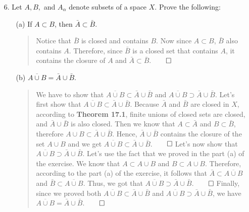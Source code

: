 \documentclass[12pt, a4paper]{article}
\begin{document}
\begin{itemize}
\item[]
\item[]

\item[6.]
Let $A, B,$ and $A_\alpha$ denote subsets of a space $X$. Prove the following:
\begin{itemize}
\item[(a)]
If $A \subset B$, then $\bar{A} \subset \bar{B}$.
\begin{quote}
Notice that $\bar{B}$ is closed and contains $B$. Now since $A \subset B$, $\bar{B}$ also
contains $A$. Therefore, since $\bar{B}$ is a closed set that contains $A$,
it contains the closure of $A$ and $\bar{A} \subset \bar{B}$.$\qed$
\end{quote}

\item[]
\item[]

\item[(b)]
$\overline{A \cup B} = \bar{A} \cup \bar{B}$.
\begin{quote}
We have to show that $\overline{A \cup B} \subset \bar{A} \cup \bar{B}$
and $\overline{A \cup B} \supset \bar{A} \cup \bar{B}$.
\newline
\newline
Let's first show that $\overline{A \cup B} \subset \bar{A} \cup \bar{B}$.
Because $\bar{A}$ and $\bar{B}$ are closed in $X$, according to \textbf{Theorem 17.1},
finite unions of closed sets are closed, and $\bar{A} \cup \bar{B}$ is also closed.
Then we know that $A \subset \bar{A}$ and $B \subset \bar{B}$, therefore $A \cup B \subset \bar{A} \cup \bar{B}$.
Hence, $\bar{A} \cup \bar{B}$ contains the closure of the set $A \cup B$ and we get $\overline{A \cup B} \subset \bar{A} \cup \bar{B}$.$\qed$
\newline
\newline
Let's now show that $\overline{A \cup B} \supset \bar{A} \cup \bar{B}$.
Let's use the fact that we proved in the part (a) of the exercise.
We know that $A \subset A \cup B$ and $B \subset A \cup B$. Therefore,
according to the part (a) of the exercise, it follows that $\bar{A} \subset \overline{A \cup B}$
and $\bar{B} \subset \overline{A \cup B}$. Thus, we got that $\overline{A \cup B} \supset \bar{A} \cup \bar{B}$.$\qed$
\newline
\newline
Finally, since we proved both $\overline{A \cup B} \subset \bar{A} \cup \bar{B}$
and $\overline{A \cup B} \supset \bar{A} \cup \bar{B}$, we have $\overline{A \cup B} = \bar{A} \cup \bar{B}$.$\qed$
\end{quote}


\end{itemize}
\end{itemize}
\end{document}
